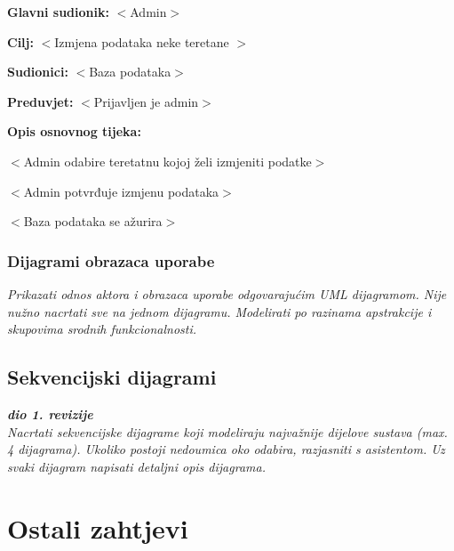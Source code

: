					\noindent {}
					\begin{packed_item}
	
						\item \textbf{Glavni sudionik: } $<$Admin$>$
						\item  \textbf{Cilj:} $<$Izmjena podataka neke teretane $>$
						\item  \textbf{Sudionici:} $<$Baza podataka$>$
						\item  \textbf{Preduvjet:} $<$Prijavljen je admin$>$
						\item  \textbf{Opis osnovnog tijeka:}
						
						\item[] \begin{packed_enum}
	
							\item $<$Admin odabire teretatnu kojoj želi izmjeniti podatke$>$
							\item $<$Admin potvrđuje izmjenu podataka$>$
							\item $<$Baza podataka se ažurira$>$
						\end{packed_enum}
						
	
					\end{packed_item}
				
					
				\subsubsection{Dijagrami obrazaca uporabe}
					
					\textit{Prikazati odnos aktora i obrazaca uporabe odgovarajućim UML dijagramom. Nije nužno nacrtati sve na jednom dijagramu. Modelirati po razinama apstrakcije i skupovima srodnih funkcionalnosti.}
				\eject		
				
			\subsection{Sekvencijski dijagrami}
				
				\textbf{\textit{dio 1. revizije}}\\
				
				\textit{Nacrtati sekvencijske dijagrame koji modeliraju najvažnije dijelove sustava (max. 4 dijagrama). Ukoliko postoji nedoumica oko odabira, razjasniti s asistentom. Uz svaki dijagram napisati detaljni opis dijagrama.}
				\eject
	
		\section{Ostali zahtjevi}
		
